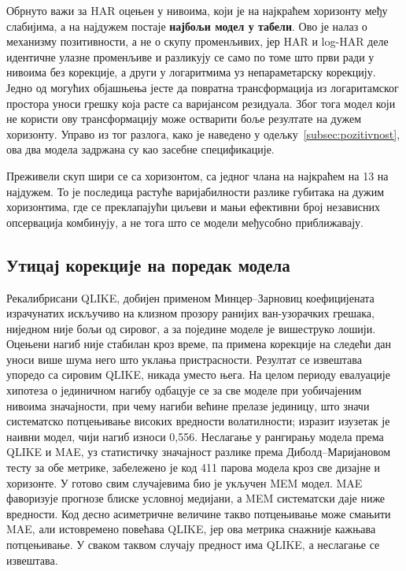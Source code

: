 Обрнуто важи за HAR оцењен у нивоима, који је на најкраћем хоризонту међу слабијима, а
на најдужем постаје \textbf{најбољи модел у табели}. Ово је налаз о механизму позитивности,
а не о скупу променљивих, јер HAR и log-HAR деле идентичне улазне променљиве и
разликују се само по томе што први ради у нивоима без корекције, а други у логаритмима
уз непараметарску корекцију. Једно од могућих објашњења јесте да повратна трансформација из
логаритамског простора уноси грешку која расте са варијансом резидуала. Због тога модел
који не користи ову трансформацију може остварити боље резултате на дужем хоризонту.
Управо из тог разлога, како је наведено у одељку~\ref{subsec:pozitivnost}, ова два
модела задржана су као засебне спецификације.

Преживели скуп шири се са хоризонтом, са једног члана на најкраћем на 13 на
најдужем. То је последица растуће варијабилности разлике губитака на дужим хоризонтима,
где се преклапајући циљеви и мањи ефективни број независних опсервација комбинују, а не
тога што се модели међусобно приближавају.

\subsection{Утицај корекције на поредак модела}

Рекалибрисани QLIKE, добијен применом Минцер–Зарновиц коефицијената израчунатих
искључиво на клизном прозору ранијих ван-узорачких грешака, ниједном није бољи од
сировог, а за поједине моделе је вишеструко лошији. Оцењени нагиб није стабилан кроз
време, па примена корекције на следећи дан уноси више шума него што уклања
пристрасности. Резултат се извештава упоредо са сировим QLIKE, никада уместо њега. На
целом периоду евалуације хипотеза о јединичном нагибу одбацује се за све моделе при
уобичајеним нивоима значајности, при чему нагиби већине прелазе јединицу, што значи
систематско потцењивање високих вредности волатилности; изразит изузетак је наивни
модел, чији нагиб износи 0,556. Неслагање у рангирању модела према QLIKE и MAE, уз
статистичку значајност разлике према Диболд–Маријановом тесту за обе метрике, забележено
је код 411 парова модела кроз све дизајне и хоризонте. У готово свим случајевима био је
укључен MEM модел. MAE фаворизује прогнозе блиске условној медијани, а MEM систематски
даје ниже вредности. Код десно асиметричне величине такво потцењивање може смањити MAE,
али истовремено повећава QLIKE, јер ова метрика снажније кажњава потцењивање. У сваком
таквом случају предност има QLIKE, а неслагање се извештава.

